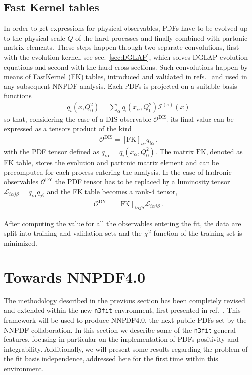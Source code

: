 \subsection{Fast Kernel tables}
\label{sec:FK_nnpdf}
In order to get expressions for physical observables, PDFs have to be
evolved up to the physical scale $Q$ of the hard processes and finally 
combined with partonic matrix elements. These steps happen through two separate convolutions, first with
the evolution kernel, see sec.~\ref{sec:DGLAP}, which solves DGLAP evolution equations and second with the hard cross sections.
Such convolutions happen by means of FastKernel (FK) tables, introduced and validated in refs.~\cite{Ball:2010de,Bertone:2016lga}
and used in any subsequent NNPDF analysis.
Each PDFs is projected on a suitable basis functions
\begin{align}
    \label{eq:pdf_interpolation_basis}
    q_i\left(x,Q_0^2\right) = \sum_{\alpha}q_i\left(x_{\alpha},Q_0^2\right)\mathcal{I}^{(\alpha)}\left(x\right) 
\end{align}
so that, considering the case of a DIS observable $\mathcal{O}^{\text{DIS}}$, its final value 
can be expressed as a tensors product of the kind  
\begin{align}
    \label{eq:DIS_obs}
    \mathcal{O}^{\text{DIS}} = \left[\text{FK}\right]_{i\alpha}q_{i\alpha}\,.
\end{align}
with the PDF tensor defined as $q_{i\alpha} = q_i\left(x_{\alpha},Q_0^2\right)$.
The matrix $\text{FK}$, denoted as FK table, stores the evolution and partonic matrix element 
and can be precomputed for each process entering the analysis.
In the case of hadronic observables $\mathcal{O}^{\text{DY}}$ 
the PDF tensor has to be replaced by a luminosity tensor $\mathcal{L}_{i\alpha j\beta} = q_{i\alpha}q_{j\beta}$ 
and the FK table becomes a rank-4 tensor,
\begin{align}
    \label{eq:DY_obs}
    \mathcal{O}^{\text{DY}} = \left[\text{FK}\right]_{i\alpha j\beta}\mathcal{L}_{i\alpha j\beta}\,.
\end{align}

%
After computing the value for all the observables entering the fit, the data are split into training and 
validation sets and the $\chi^2$ function of the training set is minimized.



\section{Towards NNPDF4.0}
\label{sec:n3fit}
The methodology described in the previous section has been completely revised and extended within the new
{\tt n3fit} environment, first presented in ref.~\cite{Carrazza:2019mzf}.
This framework will be used to produce NNPDF4.0, the next public PDFs set by the NNPDF collaboration.
In this section we describe some of the {\tt n3fit} general features, focusing in particular
on the implementation of PDFs positivity and integrability. 
Additionally, we will present some results regarding the problem of the fit basis independence,
addressed here for the first time within this environment.

